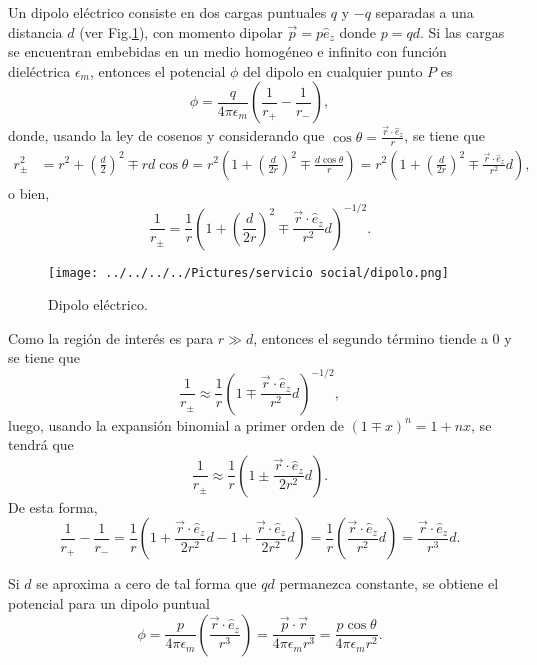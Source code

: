 Un dipolo eléctrico consiste en dos cargas puntuales $q$ y $-q$ separadas a una distancia $d$ (ver Fig.\ref{dipolo_elec}), con momento dipolar $\Vec{p}=p\hat{e}_z$ donde $p=qd$. Si las cargas se encuentran embebidas en un medio homogéneo e infinito con función dieléctrica $\epsilon_m$, entonces el potencial $\phi$ del dipolo en cualquier punto $P$ es \cite{Bohren,Griffiths}
\begin{equation}
    \phi=\frac{q}{4\pi\epsilon_m}\left(\frac{1}{r_+}-\frac{1}{r_{-}}\right),    
\end{equation}
donde, usando la ley de cosenos y considerando que $\cos\theta=\frac{\Vec{r}\cdot\hat{e}_z}{r}$, se tiene que 
\begin{align*}
    r_{\pm}^2&=r^2+\left(\frac{d}{2}\right)^2 \mp rd\cos\theta=r^2\left(1+\left(\frac{d}{2r}\right)^2\mp \frac{d\cos\theta}{r}\right)=r^2\left(1+\left(\frac{d}{2r}\right)^2\mp \frac{\Vec{r}\cdot\hat{e}_z}{r^2}d\right),
\end{align*}
o bien,
\begin{equation*}
  \frac{1}{r_{\pm}}=\frac{1}{r}\left(1+\left(\frac{d}{2r}\right)^2\mp \frac{\Vec{r}\cdot\hat{e}_z}{r^2}d\right)^{-1/2}.  
\end{equation*}
\begin{figure}[h!]
    \centering
    \texttt{[image: ../../../../Pictures/servicio social/dipolo.png]} 
    \caption{Dipolo eléctrico.}
    \label{dipolo_elec}
\end{figure}
Como la región de interés es para $r\gg d$, entonces el segundo término tiende a 0 y se tiene que
\begin{equation*}
    \frac{1}{r_{\pm}}\approx\frac{1}{r}\left(1\mp \frac{\Vec{r}\cdot\hat{e}_z}{r^2}d\right)^{-1/2},
\end{equation*}
luego, usando la expansión binomial a primer orden de $(1\mp x)^n=1+nx$,  se tendrá que
\begin{equation*}
    \frac{1}{r_{\pm}}\approx\frac{1}{r}\left(1\pm \frac{\Vec{r}\cdot\hat{e}_z}{2r^2}d\right).
\end{equation*}
De esta forma,
\begin{equation}
    \frac{1}{r_+}-\frac{1}{r_{-}}=\frac{1}{r}\left(1+ \frac{\Vec{r}\cdot\hat{e}_z}{2r^2}d-1+ \frac{\Vec{r}\cdot\hat{e}_z}{2r^2}d\right)=\frac{1}{r}\left( \frac{\Vec{r}\cdot\hat{e}_z}{r^2}d\right)=\frac{\Vec{r}\cdot\hat{e}_z}{r^3}d.    
\end{equation}

Si $d$ se aproxima a cero de tal forma que $qd$ permanezca constante, se obtiene el potencial para un dipolo puntual
\begin{equation}
\phi=\frac{p}{4\pi\epsilon_m}\left(\frac{\Vec{r}\cdot\hat{e}_z}{r^3}\right)=\frac{\Vec{p}\cdot\Vec{r}}{4\pi\epsilon_m r^3}=\frac{p\cos\theta}{4\pi\epsilon_m r^2}.
\label{pot_dipolo}
\end{equation}


